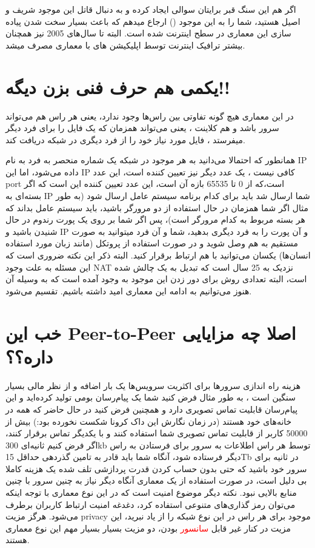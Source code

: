 \documentclass[]{article}
\begin{document}
اگر هم این سنگ قبر برایتان سوالی ایجاد کرده و به دنبال قاتل این موجود شریف و اصیل هستید، شما را به این موجود () ارجاع میدهم که باعث بسیار سخت شدن پیاده سازی این معماری در سطح اینترنت شده است. البته تا سال‌های 2005 نیز همچنان بیشتر ترافیک اینترنت توسط اپلیکیشن های با معماری  مصرف میشد.
 
 
\section*{{\titr یکمی هم حرف فنی بزن دیگه!!}}

در این معماری هیچ گونه تفاوتی بین راس‌ها وجود ندارد، یعنی هر راس هم می‌تواند سرور باشد و هم کلاینت ، یعنی می‌تواند همزمان که یک فایل را برای فرد دیگر میفرستد ، فایل مورد نیاز خود را از فرد دیگری در شبکه دریافت کند.

همانطور که احتمالا می‌دانید به هر موجود در شبکه یک شماره منحصر به فرد به نام IP داده می‌شود، اما این IP کافی نیست ، یک عدد دیگر نیز تعیین کننده است، این عدد port است،که از 0 تا 65535 بازه آن است، این عدد تعیین کننده این است که اگر بسته‌ای به IP شما ارسال شد باید برای کدام برنامه سیستم عامل ارسال شود (به طور مثال اگر شما همزمان در حال استفاده از دو مرورگر باشید، باید سیستم عامل بداند که هر بسته مربوط به کدام مرورگر است)، پس اگر شما بر روی یک پورت رندوم در حال شنیدن باشید و IP و آن پورت را به فرد دیگری بدهید‌، شما و آن فرد میتوانید به صورت مستقیم به هم وصل شوید و در صورت استفاده از پروتکل (مانند زبان مورد استفاده انسان‌ها) یکسان می‌توانید با هم ارتباط برقرار کنید.
البته ذکر این نکته ضروری است که این مسئله به علت وجود NAT نزدیک به 25 سال است که تبدیل به یک چالش شده است، البته تعدادی روش برای دور زدن این موجود  به وجود آمده است که به وسیله آن هنوز می‌توانیم به ادامه این معماری امید داشته باشیم.
   تقسیم می‌شود.


\newpage
\section*{{\titr خب این Peer-to-Peer اصلا چه مزایایی داره؟؟}}


هزینه راه اندازی سرور‌ها برای اکثریت سرویس‌ها یک بار اضافه و از نظر مالی بسیار سنگین است ، به طور مثال فرض کنید شما یک پیام‌رسان بومی تولید کرده‌اید و این پیام‌رسان قابلیت تماس تصویری دارد و همچنین فرض کنید در حال حاضر که همه در خانه‌های خود هستند (در زمان نگارش این داک کرونا شکست نخورده بود:) بیش از 50000 کاربر از قابلیت تماس تصویری شما استفاده کنند و با یکدیگر تماس برقرار کنند، اگر فرض کنیم ثانیه‌ای 300kb توسط هر راس اطلاعات به سرور برای فرستادن به راس دیگر فرستاده شود‌، آنگاه شما باید قادر به تامین گذردهی حداقل 15Tb در ثانیه برای سرور خود باشید که حتی بدون حساب کردن قدرت پردازشی تلف شده یک هزینه کاملا بی دلیل است، در صورت استفاده از یک معماری  آنگاه دیگر نیاز به چنین سرور با چنین منابع بالایی نبود. نکته دیگر موضوع امنیت است که در این نوع معماری با توجه اینکه می‌توان رمز گذاری‌های متنوعی استفاده کرد، دغدغه امنیت ارتباط کاربران برطرف می‌شود. 
هرگز مزیت privacy موجود برای هر راس در این نوع شبکه را از یاد نبرید، این مزیت در کنار غیر قابل \textcolor{red}{سانسور} بودن‌، دو مزیت بسیار بسیار مهم این نوع معماری هستند.
\end{document}
